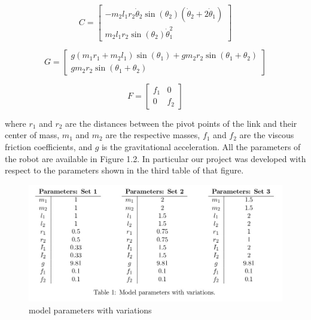 \documentclass[a4paper,11pt,oneside]{book}
\begin{document}
\[
C = 
\begin{bmatrix}
-m_2l_1r_2\dot{\theta}_2\sin(\theta_2)(\dot{\theta}_2 + 2\dot{\theta}_1) \\
m_2l_1r_2\sin(\theta_2)\dot{\theta}_1^2
\end{bmatrix}
\]

\[
G = 
\begin{bmatrix}
g(m_1r_1 + m_2l_1)\sin(\theta_1) + gm_2r_2\sin(\theta_1 + \theta_2) \\
gm_2r_2\sin(\theta_1 + \theta_2)
\end{bmatrix}
\]

\[
F = 
\begin{bmatrix}
f_1 & 0 \\
0 & f_2
\end{bmatrix}
\]
\begin{justify}
    {where \( r_1 \) and \( r_2 \) are the distances between the pivot points of the link and their center of mass, \( m_1 \) and \( m_2 \) are the respective masses, \( f_1 \) and \( f_2 \) are the viscous friction coefficients, and \( g \) is the gravitational acceleration. All the parameters of the robot are available in Figure 1.2. In particular our project was developed with respect to the parameters shown in the third table of that figure.}
\end{justify}
\begin{figure}[H]
    \centering
    \includegraphics[width=0.7\linewidth]{parameters.png}
    \caption{model parameters with variations}
    \label{fig:enter-label}
\end{figure}
\end{document}
